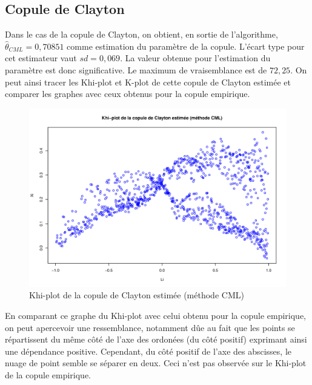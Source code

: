 \subsection{Copule de Clayton}

Dans le cas de la copule de Clayton, on obtient, en sortie de l'algorithme, $\widehat{\theta}_{CML}=0,70851$ comme estimation du paramètre de la copule. L'écart type pour cet estimateur vaut $sd = 0,069$. La valeur obtenue pour l'estimation du paramètre est donc significative. Le maximum de vraisemblance est de $72,25$. 
On peut ainsi tracer les Khi-plot et K-plot de cette copule de Clayton estimée et comparer les graphes avec ceux obtenus pour la copule empirique.

\noindent%
\begin{figure}[H]
    \begin{center}
      \includegraphics[width=17 cm, angle=0]{./pictures/claytoncmlkhiplot.png}
      \centering\caption{\label{2}Khi-plot de la copule de Clayton estimée (méthode CML)}
    \end{center}
\end{figure}

En comparant ce graphe du Khi-plot avec celui obtenu pour la copule empirique, on peut apercevoir une ressemblance, notamment dûe au fait que les points se répartissent du même côté de l'axe des ordonées (du côté positif) exprimant ainsi une dépendance positive. Cependant, du côté positif de l'axe des abscisses, le nuage de point semble se séparer en deux. Ceci n'est pas observée sur le Khi-plot de la copule empirique. 

